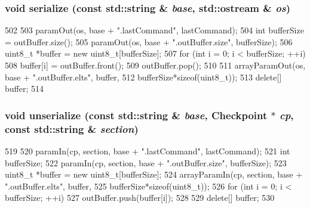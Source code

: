 \hypertarget{classX86ISA_1_1PS2Keyboard_ab4138b21b48e3371a8e20df72b675a88}{
\subsubsection[{serialize}]{\setlength{\rightskip}{0pt plus 5cm}void serialize (const std::string \& {\em base}, \/  std::ostream \& {\em os})}}
\label{classX86ISA_1_1PS2Keyboard_ab4138b21b48e3371a8e20df72b675a88}



\begin{DoxyCode}
502 {
503     paramOut(os, base + ".lastCommand", lastCommand);
504     int bufferSize = outBuffer.size();
505     paramOut(os, base + ".outBuffer.size", bufferSize);
506     uint8_t *buffer = new uint8_t[bufferSize];
507     for (int i = 0; i < bufferSize; ++i) {
508         buffer[i] = outBuffer.front();
509         outBuffer.pop();
510     }
511     arrayParamOut(os, base + ".outBuffer.elts", buffer,
512             bufferSize*sizeof(uint8_t));
513     delete[] buffer;
514 }
\end{DoxyCode}
\hypertarget{classX86ISA_1_1PS2Keyboard_a147c320e3d6506edf5587a40cd8e430d}{
\subsubsection[{unserialize}]{\setlength{\rightskip}{0pt plus 5cm}void unserialize (const std::string \& {\em base}, \/  {\bf Checkpoint} $\ast$ {\em cp}, \/  const std::string \& {\em section})}}
\label{classX86ISA_1_1PS2Keyboard_a147c320e3d6506edf5587a40cd8e430d}



\begin{DoxyCode}
519 {
520     paramIn(cp, section, base + ".lastCommand", lastCommand);
521     int bufferSize;
522     paramIn(cp, section, base + ".outBuffer.size", bufferSize);
523     uint8_t *buffer = new uint8_t[bufferSize];
524     arrayParamIn(cp, section, base + ".outBuffer.elts", buffer,
525             bufferSize*sizeof(uint8_t));
526     for (int i = 0; i < bufferSize; ++i) {
527         outBuffer.push(buffer[i]);
528     }
529     delete[] buffer;
530 }
\end{DoxyCode}


